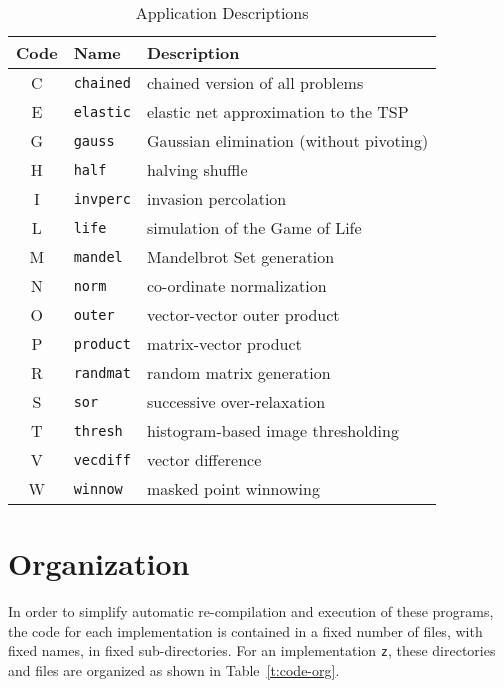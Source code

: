 \begin{table}
\begin{small}\begin{center}\begin{tabular}{cll}
Code	& Name			& Description	\\
\hline
C	& {\tt{chained}}	& chained version of all problems\\
E	& {\tt{elastic}}	& elastic net approximation to the TSP\\
G	& {\tt{gauss}}		& Gaussian elimination (without pivoting)\\
H	& {\tt{half}}		& halving shuffle\\
I	& {\tt{invperc}}	& invasion percolation\\
\hline
L	& {\tt{life}}		& simulation of the Game of Life\\
M	& {\tt{mandel}}		& Mandelbrot Set generation\\
N	& {\tt{norm}}		& co-ordinate normalization\\
O	& {\tt{outer}}		& vector-vector outer product\\
P	& {\tt{product}}	& matrix-vector product\\
\hline
R	& {\tt{randmat}}	& random matrix generation\\
S	& {\tt{sor}}		& successive over-relaxation\\
T	& {\tt{thresh}}		& histogram-based image thresholding\\
V	& {\tt{vecdiff}}	& vector difference\\
W	& {\tt{winnow}}		& masked point winnowing
\end{tabular}\end{center}\end{small}
\caption{Application Descriptions\label{t:problem-codes}}
\end{table}

\section{Organization\label{s:org}}

In order to simplify automatic re-compilation and execution of these programs,
the code for each implementation is contained in a fixed number of files,
with fixed names,
in fixed sub-directories.
For an implementation {\tt{z}},
these directories and files are organized as shown in Table~\ref{t:code-org}.

